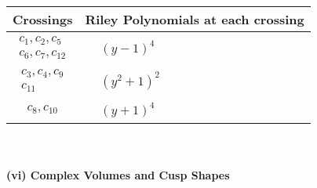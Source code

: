 \documentclass[1p]{elsarticle_modified}
\theoremstyle{definition}
\begin{document}
\begin{tabular}{m{50pt}|m{274pt}}
Crossings & \hspace{64pt}Riley Polynomials at each crossing \\
\hline $$\begin{aligned}c_{1},c_{2},c_{5}\\c_{6},c_{7},c_{12}\end{aligned}$$&$\begin{aligned}
&(y-1)^4
\end{aligned}$\\
\hline $$\begin{aligned}c_{3},c_{4},c_{9}\\c_{11}\end{aligned}$$&$\begin{aligned}
&(y^2+1)^2
\end{aligned}$\\
\hline $$\begin{aligned}c_{8},c_{10}\end{aligned}$$&$\begin{aligned}
&(y+1)^4
\end{aligned}$\\
\hline
\end{tabular}\\~\\
\newpage\flushleft \textbf{(vi) Complex Volumes and Cusp Shapes}
\end{document}
